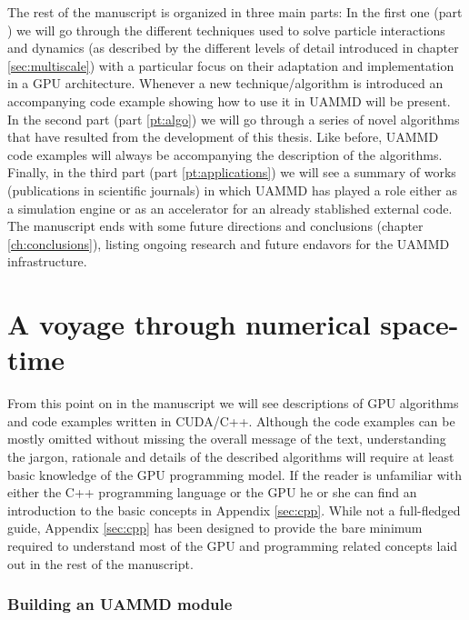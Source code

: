 \documentclass[ twoside,openright,titlepage,numbers=noenddot,%
headinclude,footinclude,cleardoublepage=empty,abstract=on,
BCOR=5mm,paper=a4,fontsize=11pt, dvipsnames
]{scrreprt}
\newcommand{\uammd}{\gls{UAMMD}\xspace}
\newcommand{\gpu}{\gls{GPU}\xspace}
\begin{document}
The rest of the manuscript is organized in three main parts: In the first one (part \ref{part:voyage}) we will go through the different techniques used to solve particle interactions and dynamics (as described by the different levels of detail introduced in chapter \ref{sec:multiscale}) with a particular focus on their adaptation and implementation in a \gpu architecture. Whenever a new technique/algorithm is introduced an accompanying code example showing how to use it in \uammd will be present.
 In the second part (part \ref{pt:algo}) we will go through a series of novel algorithms that have resulted from the development of this thesis. Like before, \uammd code examples will always be accompanying the description of the algorithms. Finally, in the third part (part \ref{pt:applications}) we will see a summary of works (publications in scientific journals) in which \uammd has played a role either as a simulation engine or as an accelerator for an already stablished external code. The manuscript ends with some future directions and conclusions (chapter \ref{ch:conclusions}), listing ongoing research and future endavors for the \uammd infrastructure.



\newpage

\cleardoublepage

\part{A voyage through numerical space-time}\label{part:voyage}


From this point on in the manuscript we will see descriptions of GPU algorithms and code examples written in CUDA/C++. Although the code examples can be mostly omitted without missing the overall message of the text, understanding the jargon, rationale and details of the described algorithms will require at least basic knowledge of the GPU programming model. If the reader is unfamiliar with either the C++ programming language or the GPU he or she can find an introduction to the basic concepts in Appendix \ref{sec:cpp}. While not a full-fledged guide, Appendix \ref{sec:cpp} has been designed to provide the bare minimum required to understand most of the GPU and programming related concepts laid out in the rest of the manuscript.

\section{Building an UAMMD module}
\end{document}
